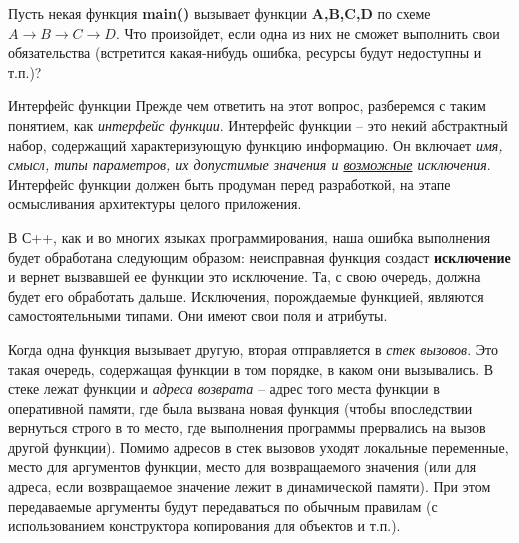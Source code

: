 \renewcommand{\mainFolder}{/home/aleksei/github_projects/latex_works/informatics}
\renewcommand{\myFolder}{\mainFolder/lecture_\arabic{lectureNo}/}

\renewcommand{\lectureSubject}{Исключения в С++}
%



\begin{lecture}[\lectureSubject]
	\begin{lecSection}
		Пусть некая функция \textbf{main()} вызывает функции \textbf{A,B,C,D} по схеме $A\rightarrow B\rightarrow C\rightarrow D$. Что произойдет, если одна из них не сможет выполнить свои обязательства (встретится какая-нибудь ошибка, ресурсы будут недоступны и т.п.)?
		\begin{lecSubsection}{Интерфейс функции}
			Прежде чем ответить на этот вопрос, разберемся с таким понятием, как \textit{интерфейс функции}. Интерфейс функции -- это некий абстрактный набор, содержащий характеризующую функцию информацию. Он включает \textit{имя, смысл, типы параметров, их допустимые значения и \underline{возможные} исключения}. Интерфейс функции должен быть продуман перед разработкой, на этапе осмысливания архитектуры целого приложения.
		\end{lecSubsection}
	\end{lecSection}
	\begin{lecSection}[Исключения в С++]
		\label{exc1}
		В С++, как и во многих языках программирования, наша ошибка выполнения будет обработана следующим образом: неисправная функция создаст \textbf{исключение} и вернет вызвавшей ее функции это исключение. Та, с свою очередь, должна будет его обработать дальше. Исключения, порождаемые функцией, являются самостоятельными типами. Они имеют свои поля и атрибуты.
	\end{lecSection}
	\begin{lecSection}
			Когда одна функция вызывает другую, вторая отправляется в \textit{стек вызовов}. Это такая очередь, содержащая функции в том порядке, в каком они вызывались. В стеке лежат функции и \textit{адреса возврата} -- адрес того места функции в оперативной памяти, где была вызвана новая функция (чтобы впоследствии вернуться строго в то место, где выполнения программы прервались на вызов другой функции). Помимо адресов в стек вызовов уходят локальные переменные, место для аргументов функции, место для возвращаемого значения (или для адреса, если возвращаемое значение лежит в динамической памяти). При этом передаваемые аргументы будут передаваться по обычным правилам (с использованием конструктора копирования для объектов и т.п.).

\end{lecSection}
\end{lecture}
